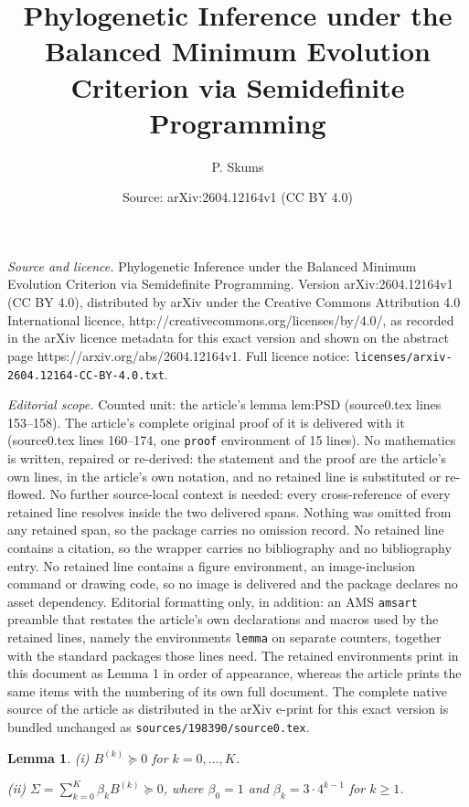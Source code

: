 \documentclass[10pt,a4paper]{amsart}
\title{Phylogenetic Inference under the Balanced Minimum Evolution Criterion via Semidefinite Programming}
\author{P. Skums}
\date{Source: arXiv:2604.12164v1 (CC BY 4.0)}
\newtheorem{lemma}{Lemma}
\begin{document}
\maketitle

\noindent\emph{Source and licence.} Phylogenetic Inference under the Balanced Minimum Evolution Criterion via Semidefinite Programming. Version arXiv:2604.12164v1 (CC BY 4.0), distributed by arXiv under the Creative Commons Attribution 4.0 International licence, http://creativecommons.org/licenses/by/4.0/, as recorded in the arXiv licence metadata for this exact version and shown on the abstract page https://arxiv.org/abs/2604.12164v1. Full licence notice: \texttt{licenses/arxiv-2604.12164-CC-BY-4.0.txt}.\par\smallskip

\noindent\textit{Editorial scope.} Counted unit: the article's lemma lem:PSD (source0.tex lines 153--158). The article's complete original proof of it is delivered with it (source0.tex lines 160--174, one \texttt{proof} environment of 15 lines). No mathematics is written, repaired or re-derived: the statement and the proof are the article's own lines, in the article's own notation, and no retained line is substituted or re-flowed.  No further source-local context is needed: every cross-reference of every retained line resolves inside the two delivered spans.  Nothing was omitted from any retained span, so the package carries no omission record.  No retained line contains a citation, so the wrapper carries no bibliography and no bibliography entry.  No retained line contains a figure environment, an image-inclusion command or drawing code, so no image is delivered and the package declares no asset dependency.  Editorial formatting only, in addition: an AMS \texttt{amsart} preamble that restates the article's own declarations and macros used by the retained lines, namely the environments \texttt{lemma} on separate counters, together with the standard packages those lines need.  The retained environments print in this document as Lemma 1 in order of appearance, whereas the article prints the same items with the numbering of its own full document.  The complete native source of the article as distributed in the arXiv e-print for this exact version is bundled unchanged as \texttt{sources/198390/source0.tex}.
\begin{lemma}\label{lem:PSD}
(i) $B^{(k)}\succeq0$ for $k=0,\dots,K$.

(ii) $\Sigma=\sum_{k=0}^K \beta_k B^{(k)}\succeq0$, where
$\beta_0=1$ and $\beta_k=3\cdot4^{k-1}$ for $k\ge1$.
\end{lemma}
\end{document}

